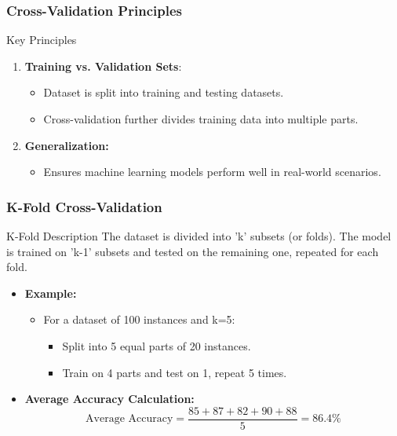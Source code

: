 \documentclass[aspectratio=169]{beamer}
\begin{document}
\begin{frame}[fragile]
    \frametitle{Cross-Validation Principles}
    \begin{block}{Key Principles}
        \begin{enumerate}
            \item \textbf{Training vs. Validation Sets}:
                \begin{itemize}
                    \item Dataset is split into training and testing datasets.
                    \item Cross-validation further divides training data into multiple parts.
                \end{itemize}
            \item \textbf{Generalization:}
                \begin{itemize}
                    \item Ensures machine learning models perform well in real-world scenarios.
                \end{itemize}
        \end{enumerate}
    \end{block}
\end{frame}

\begin{frame}[fragile]
    \frametitle{K-Fold Cross-Validation}
    \begin{block}{K-Fold Description}
        The dataset is divided into 'k' subsets (or folds). The model is trained on 'k-1' subsets and tested on the remaining one, repeated for each fold.
    \end{block}
    \begin{itemize}
        \item \textbf{Example:} 
            \begin{itemize}
                \item For a dataset of 100 instances and k=5:
                \begin{itemize}
                    \item Split into 5 equal parts of 20 instances.
                    \item Train on 4 parts and test on 1, repeat 5 times.
                \end{itemize}
            \end{itemize}
        \item \textbf{Average Accuracy Calculation:}
        \begin{equation}
            \text{Average Accuracy} = \frac{85 + 87 + 82 + 90 + 88}{5} = 86.4\%
        \end{equation}
    \end{itemize}
\end{frame}
\end{document}
